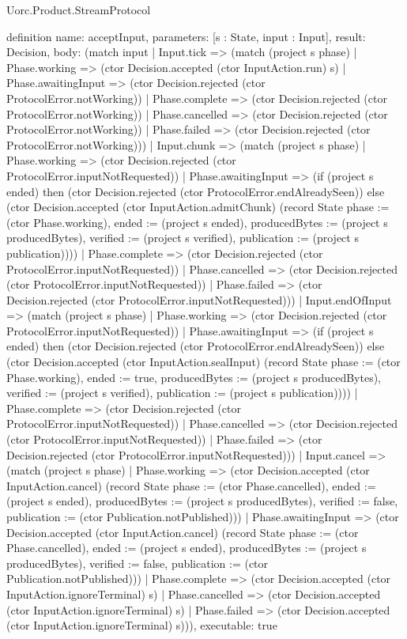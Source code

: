 \begin{lexlean}{Uorc.Product.StreamProtocol}
\begin{semanticmodule}
definition{
  name: acceptInput,
  parameters: [s : State, input : Input],
  result: Decision,
  body: (match input
    | Input.tick => (match (project s phase)
      | Phase.working => (ctor Decision.accepted (ctor InputAction.run) s)
      | Phase.awaitingInput => (ctor Decision.rejected (ctor ProtocolError.notWorking))
      | Phase.complete => (ctor Decision.rejected (ctor ProtocolError.notWorking))
      | Phase.cancelled => (ctor Decision.rejected (ctor ProtocolError.notWorking))
      | Phase.failed => (ctor Decision.rejected (ctor ProtocolError.notWorking)))
    | Input.chunk => (match (project s phase)
      | Phase.working => (ctor Decision.rejected (ctor ProtocolError.inputNotRequested))
      | Phase.awaitingInput => (if (project s ended) then (ctor Decision.rejected (ctor ProtocolError.endAlreadySeen)) else (ctor Decision.accepted (ctor InputAction.admitChunk) (record State {phase := (ctor Phase.working), ended := (project s ended), producedBytes := (project s producedBytes), verified := (project s verified), publication := (project s publication)})))
      | Phase.complete => (ctor Decision.rejected (ctor ProtocolError.inputNotRequested))
      | Phase.cancelled => (ctor Decision.rejected (ctor ProtocolError.inputNotRequested))
      | Phase.failed => (ctor Decision.rejected (ctor ProtocolError.inputNotRequested)))
    | Input.endOfInput => (match (project s phase)
      | Phase.working => (ctor Decision.rejected (ctor ProtocolError.inputNotRequested))
      | Phase.awaitingInput => (if (project s ended) then (ctor Decision.rejected (ctor ProtocolError.endAlreadySeen)) else (ctor Decision.accepted (ctor InputAction.sealInput) (record State {phase := (ctor Phase.working), ended := true, producedBytes := (project s producedBytes), verified := (project s verified), publication := (project s publication)})))
      | Phase.complete => (ctor Decision.rejected (ctor ProtocolError.inputNotRequested))
      | Phase.cancelled => (ctor Decision.rejected (ctor ProtocolError.inputNotRequested))
      | Phase.failed => (ctor Decision.rejected (ctor ProtocolError.inputNotRequested)))
    | Input.cancel => (match (project s phase)
      | Phase.working => (ctor Decision.accepted (ctor InputAction.cancel) (record State {phase := (ctor Phase.cancelled), ended := (project s ended), producedBytes := (project s producedBytes), verified := false, publication := (ctor Publication.notPublished)}))
      | Phase.awaitingInput => (ctor Decision.accepted (ctor InputAction.cancel) (record State {phase := (ctor Phase.cancelled), ended := (project s ended), producedBytes := (project s producedBytes), verified := false, publication := (ctor Publication.notPublished)}))
      | Phase.complete => (ctor Decision.accepted (ctor InputAction.ignoreTerminal) s)
      | Phase.cancelled => (ctor Decision.accepted (ctor InputAction.ignoreTerminal) s)
      | Phase.failed => (ctor Decision.accepted (ctor InputAction.ignoreTerminal) s))),
  executable: true
}


\end{semanticmodule}
\end{lexlean}
